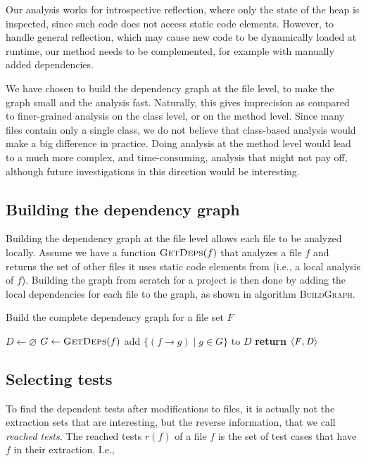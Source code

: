 {\newpage
Our analysis works for introspective reflection, where only the state of the heap is inspected, since such code does not access static code elements. However, to handle general reflection, which may cause new code to be dynamically loaded at runtime, our method needs to be complemented, for example with manually added dependencies.

We have chosen to build the dependency graph at the file level, to make the graph small and the
analysis fast. Naturally, this gives imprecision as compared to finer-grained analysis on the class
level, or on the method level. Since many files contain only a single class, we do not believe that
class-based analysis would make a big difference in practice. Doing analysis at the method level
would lead to a much more complex, and time-consuming, analysis that might not pay off, although future investigations in this direction would be interesting.

\subsection{Building the dependency graph}

Building the dependency graph at the file level allows each file to be analyzed locally. Assume we
have a function $\textsc{GetDeps}(f)$ that analyzes a file $f$ and returns the set of other files it
uses static code elements from (i.e., a local analysis of $f$). Building the graph from scratch for a project is then done by adding the local dependencies for each file to the graph, as shown in algorithm \textsc{BuildGraph}.

\begin{algorithm}
\caption{Build the complete dependency graph for a file set $F$}
\begin{algorithmic}
   \State $D\gets \varnothing$
      \State $G \gets \Call{GetDeps}{f}$
      \State add $\{(f \rightarrow g) \mid g \in G\}$ to $D$
   \EndFor
   \State \textbf{return} $\left \langle \mathit{ F,D }\right \rangle $
\EndProcedure
\end{algorithmic}
\end{algorithm}



\subsection{Selecting tests}
\label{ReachedTests}
To find the dependent tests after modifications to files, it is actually not the extraction sets that are interesting, but the reverse information, that we call \emph{reached tests}. The reached tests $r(f)$ of a file $f$ is the set of test cases that have $f$ in their extraction. I.e., 

}
